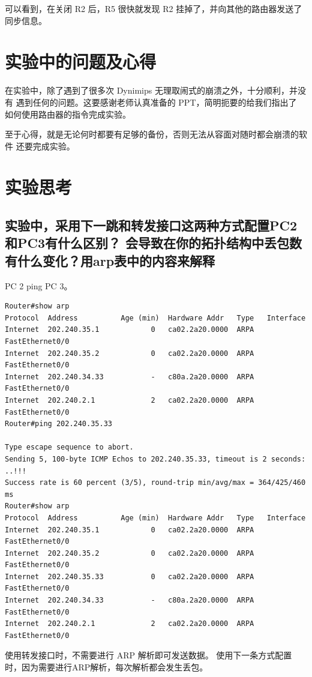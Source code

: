 \documentclass[black,normal,cn]{elegantnote}
\begin{document}
可以看到，在关闭 R2 后，R5 很快就发现 R2 挂掉了，并向其他的路由器发送了同步信息。
\section{实验中的问题及心得}

在实验中，除了遇到了很多次 Dynimips 无理取闹式的崩溃之外，十分顺利，并没有
遇到任何的问题。这要感谢老师认真准备的 PPT，简明扼要的给我们指出了
如何使用路由器的指令完成实验。

至于心得，就是无论何时都要有足够的备份，否则无法从容面对随时都会崩溃的软件
还要完成实验。


\section{实验思考}
\subsection{实验中，采用下一跳和转发接口这两种方式配置PC2和PC3有什么区别？
会导致在你的拓扑结构中丢包数有什么变化？用arp表中的内容来解释}
PC 2 ping PC 3。
\begin{lstlisting}
Router#show arp
Protocol  Address          Age (min)  Hardware Addr   Type   Interface
Internet  202.240.35.1            0   ca02.2a20.0000  ARPA   FastEthernet0/0
Internet  202.240.35.2            0   ca02.2a20.0000  ARPA   FastEthernet0/0
Internet  202.240.34.33           -   c80a.2a20.0000  ARPA   FastEthernet0/0
Internet  202.240.2.1             2   ca02.2a20.0000  ARPA   FastEthernet0/0
Router#ping 202.240.35.33

Type escape sequence to abort.
Sending 5, 100-byte ICMP Echos to 202.240.35.33, timeout is 2 seconds:
..!!!
Success rate is 60 percent (3/5), round-trip min/avg/max = 364/425/460 ms
Router#show arp
Protocol  Address          Age (min)  Hardware Addr   Type   Interface
Internet  202.240.35.1            0   ca02.2a20.0000  ARPA   FastEthernet0/0
Internet  202.240.35.2            0   ca02.2a20.0000  ARPA   FastEthernet0/0
Internet  202.240.35.33           0   ca02.2a20.0000  ARPA   FastEthernet0/0
Internet  202.240.34.33           -   c80a.2a20.0000  ARPA   FastEthernet0/0
Internet  202.240.2.1             2   ca02.2a20.0000  ARPA   FastEthernet0/0
\end{lstlisting}

使用转发接口时，不需要进行 ARP 解析即可发送数据。
使用下一条方式配置时，因为需要进行ARP解析，每次解析都会发生丢包。
\end{document}
